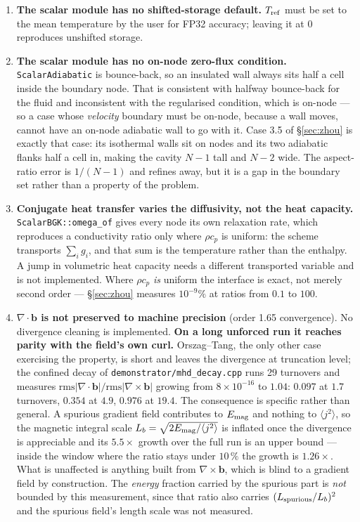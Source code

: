 \documentclass[11pt,a4paper]{article}
\newcommand{\code}[1]{\texttt{\small #1}}
\newcommand{\bb}{\bm{b}}
\begin{document}
\begin{enumerate}[leftmargin=1.4em,itemsep=4pt]
\item \textbf{The scalar module has no shifted-storage default.}
  $T_{\rm ref}$ must be set to the mean temperature by the user for FP32 accuracy;
  leaving it at $0$ reproduces unshifted storage.

\item \textbf{The scalar module has no on-node zero-flux condition.}
  \code{ScalarAdiabatic} is bounce-back, so an insulated wall always sits half a
  cell inside the boundary node. That is consistent with halfway bounce-back for
  the fluid and inconsistent with the regularised condition, which is on-node ---
  so a case whose \emph{velocity} boundary must be on-node, because a wall moves,
  cannot have an on-node adiabatic wall to go with it. Case 3.5 of
  \S\ref{sec:zhou} is exactly that case: its isothermal walls sit on nodes and
  its two adiabatic flanks half a cell in, making the cavity $N-1$ tall and $N-2$
  wide. The aspect-ratio error is $1/(N-1)$ and refines away, but it is a gap in
  the boundary set rather than a property of the problem.

\item \textbf{Conjugate heat transfer varies the diffusivity, not the heat
  capacity.} \code{ScalarBGK::omega\_of} gives every node its own relaxation
  rate, which reproduces a conductivity ratio only where $\rho c_p$ is uniform:
  the scheme transports $\sum_i g_i$, and that sum is the temperature rather
  than the enthalpy. A jump in volumetric heat capacity needs a different
  transported variable and is not implemented. Where $\rho c_p$ \emph{is}
  uniform the interface is exact, not merely second order --- \S\ref{sec:zhou}
  measures $10^{-9}\%$ at ratios from $0.1$ to $100$.

\item \textbf{$\nabla\!\cdot\!\bb$ is not preserved to machine precision}
  (order 1.65 convergence). No divergence cleaning is implemented. \textbf{On a
  long unforced run it reaches parity with the field's own curl.} Orszag--Tang,
  the only other case exercising the property, is short and leaves the
  divergence at truncation level; the confined decay of
  \code{demonstrator/mhd\_decay.cpp} runs 29 turnovers and measures
  $\mathrm{rms}|\nabla\!\cdot\!\bb| / \mathrm{rms}|\nabla\!\times\!\bb|$
  growing from $8\times10^{-16}$ to $1.04$: $0.097$ at $1.7$ turnovers, $0.354$
  at $4.9$, $0.976$ at $19.4$. The consequence is specific rather than general.
  A spurious gradient field contributes to $E_{\rm mag}$ and nothing to
  $\langle j^2\rangle$, so the magnetic integral scale
  $L_b=\sqrt{2E_{\rm mag}/\langle j^2\rangle}$ is inflated once the divergence
  is appreciable and its $5.5\times$ growth over the full run is an upper bound
  --- inside the window where the ratio stays under $10\,\%$ the growth is
  $1.26\times$. What is unaffected is anything built from $\nabla\times\bb$,
  which is blind to a gradient field by construction. The \emph{energy} fraction
  carried by the spurious part is \emph{not} bounded by this measurement, since
  that ratio also carries $(L_{\rm spurious}/L_b)^2$ and the spurious field's
  length scale was not measured.


\end{enumerate}
\end{document}
